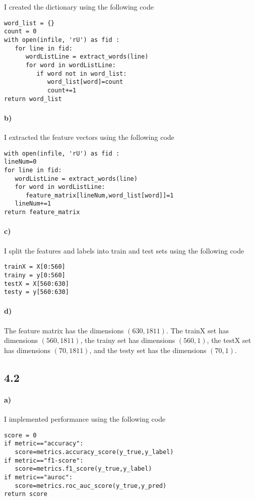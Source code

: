 \documentclass[12pt]{article}
\begin{document}
I created the dictionary using the following code
\begin{verbatim}
word_list = {}
count = 0
with open(infile, 'rU') as fid :
   for line in fid:
      wordListLine = extract_words(line)
      for word in wordListLine:
         if word not in word_list:
            word_list[word]=count
            count+=1
return word_list
\end{verbatim}

\paragraph{b)}

I extracted the feature vectors using the following code
\begin{verbatim}
with open(infile, 'rU') as fid :
lineNum=0
for line in fid:
   wordListLine = extract_words(line)
   for word in wordListLine:
      feature_matrix[lineNum,word_list[word]]=1
   lineNum+=1
return feature_matrix
\end{verbatim}

\paragraph{c)}

I split the features and labels into train and test sets using the following code
\begin{verbatim}
trainX = X[0:560]
trainy = y[0:560]
testX = X[560:630]
testy = y[560:630]
\end{verbatim}

\paragraph{d)}

The feature matrix has the dimensions \((630,1811)\). The trainX set has dimensions \((560,1811)\), the trainy set has
dimensions \((560,1)\), the testX set has dimensions \((70,1811)\), and the testy set has the dimensions \((70,1)\).

\subsection*{4.2}

\paragraph{a)}

I implemented performance using the following code
\begin{verbatim}
score = 0
if metric=="accuracy":
   score=metrics.accuracy_score(y_true,y_label)
if metric=="f1-score":
   score=metrics.f1_score(y_true,y_label)
if metric=="auroc":
   score=metrics.roc_auc_score(y_true,y_pred)
return score
\end{verbatim}
\end{document}
